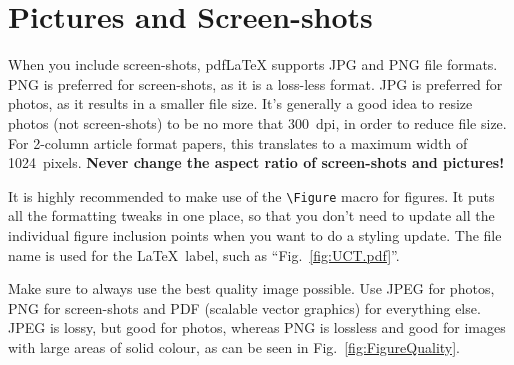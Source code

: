 
\section{Pictures and Screen-shots}

When you include screen-shots, pdf\LaTeX{} supports JPG and PNG file formats.  PNG is preferred for screen-shots, as it is a loss-less format.  JPG is preferred for photos, as it results in a smaller file size.  It's generally a good idea to resize photos (not screen-shots) to be no more that 300~dpi, in order to reduce file size.  For 2-column article format papers, this translates to a maximum width of 1024~pixels.  \textbf{Never change the aspect ratio of screen-shots and pictures!}

It is highly recommended to make use of the \verb|\Figure| macro for figures.  It puts all the formatting tweaks in one place, so that you don't need to update all the individual figure inclusion points when you want to do a styling update.  The file name is used for the \LaTeX\ label, such as ``Fig.~\ref{fig:UCT.pdf}''.


Make sure to always use the best quality image possible.  Use JPEG for photos, PNG for screen-shots and PDF (scalable vector graphics) for everything else.  JPEG is lossy, but good for photos, whereas PNG is lossless and good for images with large areas of solid colour, as can be seen in Fig.~\ref{fig:FigureQuality}.

